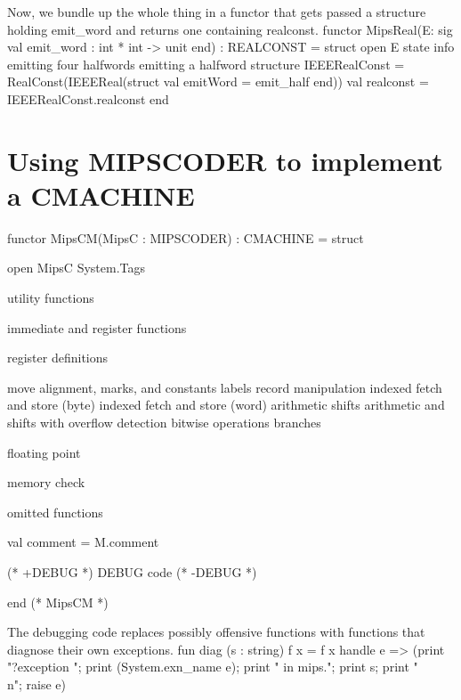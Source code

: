 \endcode
{}
Now, we bundle up the whole thing in a functor that
gets passed a structure holding \code{}emit_word\edoc{} and returns 
one containing \code{}realconst\edoc{}.
\enddocs
{}
\moddef{*}\endmoddef
functor MipsReal(E: sig val emit_word : int * int -> unit end) : REALCONST = 
struct
    open E
    \LA{}state info\RA{}
    \LA{}emitting four halfwords\RA{}
    \LA{}emitting a halfword\RA{}
    structure IEEERealConst =
        RealConst(IEEEReal(struct val emitWord = emit_half end))
    val realconst = IEEERealConst.realconst
end




\endcode
{}
\section{Using \code{}MIPSCODER\edoc{} to implement a \code{}CMACHINE\edoc{}}

\enddocs
{}
\moddef{*}\endmoddef
functor MipsCM(MipsC : MIPSCODER) : CMACHINE = struct

    open MipsC System.Tags

    \LA{}utility functions\RA{}

    \LA{}immediate and register functions\RA{}

    \LA{}register definitions\RA{}

    \LA{}move\RA{}
    \LA{}alignment, marks, and constants\RA{}
    \LA{}labels\RA{}
    \LA{}record manipulation\RA{}
    \LA{}indexed fetch and store (byte)\RA{}
    \LA{}indexed fetch and store (word)\RA{}
    \LA{}arithmetic\RA{}
    \LA{}shifts\RA{}
    \LA{}arithmetic and shifts with overflow detection\RA{}
    \LA{}bitwise operations\RA{}
    \LA{}branches\RA{}

    \LA{}floating point\RA{}

    \LA{}memory check\RA{}

    \LA{}omitted functions\RA{}

    val comment = M.comment

(* +DEBUG *)
    \LA{}DEBUG code\RA{}
(* -DEBUG *)

end (* MipsCM *)

\endcode
{}
The debugging code replaces possibly offensive functions with functions
that diagnose their own exceptions.
\enddocs
{}
\endmoddef
fun diag (s : string) f x =
        f x handle e =>
                (print "?exception "; print (System.exn_name e);
                 print " in mips."; print s; print "\\n";
                 raise e)


